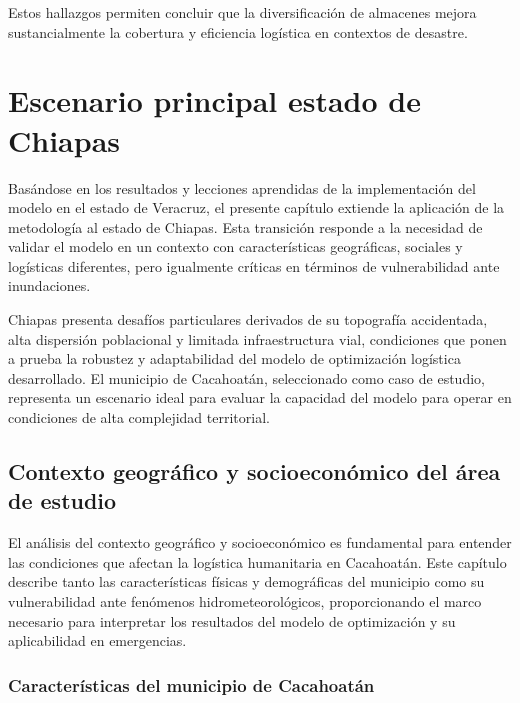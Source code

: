 \documentclass[
  spanish,
  us-letterpaper,
  DIV=11,
  numbers=noendperiod]{scrreprt}
\numberwithin{equation}{section}
\begin{document}
Estos hallazgos permiten concluir que la diversificación de almacenes
mejora sustancialmente la cobertura y eficiencia logística en contextos
de desastre.


\chapter{Escenario principal estado de
Chiapas}\label{escenario-principal-estado-de-chiapas}

Basándose en los resultados y lecciones aprendidas de la implementación
del modelo en el estado de Veracruz, el presente capítulo extiende la
aplicación de la metodología al estado de Chiapas. Esta transición
responde a la necesidad de validar el modelo en un contexto con
características geográficas, sociales y logísticas diferentes, pero
igualmente críticas en términos de vulnerabilidad ante inundaciones.

Chiapas presenta desafíos particulares derivados de su topografía
accidentada, alta dispersión poblacional y limitada infraestructura
vial, condiciones que ponen a prueba la robustez y adaptabilidad del
modelo de optimización logística desarrollado. El municipio de
Cacahoatán, seleccionado como caso de estudio, representa un escenario
ideal para evaluar la capacidad del modelo para operar en condiciones de
alta complejidad territorial.

\section{Contexto geográfico y socioeconómico del área de
estudio}\label{contexto-geogruxe1fico-y-socioeconuxf3mico-del-uxe1rea-de-estudio}

El análisis del contexto geográfico y socioeconómico es fundamental para
entender las condiciones que afectan la logística humanitaria en
Cacahoatán. Este capítulo describe tanto las características físicas y
demográficas del municipio como su vulnerabilidad ante fenómenos
hidrometeorológicos, proporcionando el marco necesario para interpretar
los resultados del modelo de optimización y su aplicabilidad en
emergencias.

\subsection{Características del municipio de
Cacahoatán}\label{caracteruxedsticas-del-municipio-de-cacahoatuxe1n}
\end{document}
